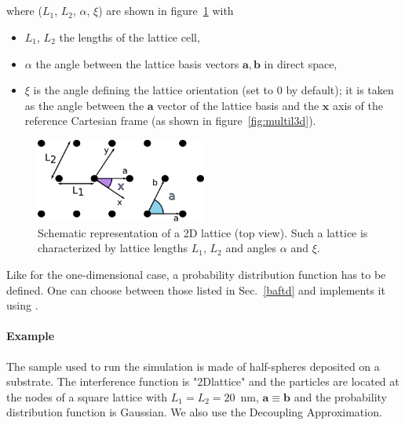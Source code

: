 \FloatBarrier

\newpage
\subsection{}
where ($L_1$, $L_2$, $\alpha$, $\xi$) are shown in figure~\ref{fig:2dlattice} with
\begin{itemize}
\item[]$L_1$, $L_2$ the lengths of the lattice cell,
\item[]$\alpha$ the angle between the lattice basis vectors $\mathbf{a}, \mathbf{b}$ in direct space,
\item[] $\xi$ is the angle defining the lattice orientation (set to $0$ by default); it is taken as the angle between the $\mathbf{a}$ vector of the lattice basis and the $\mathbf{x}$ axis of the reference Cartesian frame (as shown in figure~\ref{fig:multil3d}).
\end{itemize}

\begin{figure}[tb]
\begin{center}
\includegraphics[width=0.5\textwidth]{fig/drawing/2Dlattice.pdf}
\end{center}
\caption{Schematic representation of a 2D lattice (top view). Such a lattice is characterized by lattice lengths $L_1$, $L_2$ and angles $\alpha$ and $\xi$.}
\label{fig:2dlattice}
\end{figure}

Like for the one-dimensional case, a probability distribution function  has to be defined. One can choose between those listed in Sec.~\ref{baftd} and implements it using .

\paragraph{Example} The sample used to run the simulation is made of half-spheres deposited on a substrate. The interference function is "2Dlattice" and the particles are located at the nodes of a square lattice with $L_1=L_2=20$~nm, $\mathbf{a}\equiv \mathbf{b}$ and the probability distribution function is Gaussian. We also use the Decoupling Approximation.

